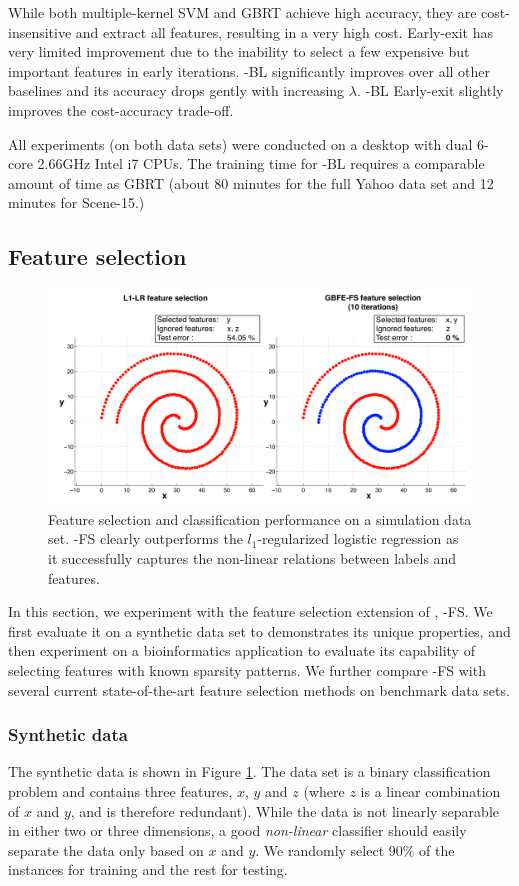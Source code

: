 While both multiple-kernel SVM and GBRT achieve high accuracy, they are cost-insensitive and extract all features, resulting in a very high cost. Early-exit has very limited improvement due to the inability to select a few expensive but important features in early iterations. \name{}-BL significantly improves over all other baselines and its accuracy drops gently with increasing $\lambda$. \name{}-BL Early-exit slightly improves the cost-accuracy trade-off.

All experiments (on both data sets) were conducted on a desktop with dual 6-core 2.66GHz Intel i7 CPUs. The training time for \name{}-BL requires a comparable amount of time as GBRT (about 80 minutes for the full Yahoo data set and 12 minutes for Scene-15.)


\subsection{Feature selection}

\begin{figure}[t!!!]
\centerline{
\includegraphics[width = .9\textwidth]{plots/simul}
}
\caption{Feature selection and classification performance on a simulation data set. \name{}-FS clearly outperforms the $l_1$-regularized logistic regression as it successfully captures the non-linear relations between labels and features.}
\label{fig:res_simul}
\end{figure}

In this section, we experiment with the feature selection extension of \name{}, \name{}-FS. We first evaluate it on a synthetic data set to demonstrates its unique properties, and then experiment on a bioinformatics application to evaluate its capability of selecting features with known sparsity patterns. We further compare \name{}-FS with several current state-of-the-art feature selection methods on benchmark data sets. 

\subsubsection{Synthetic data}
The synthetic data is shown in Figure \ref{fig:res_simul}. The data set is a binary classification problem and contains three features, $x$, $y$ and $z$ (where $z$ is a linear combination of $x$ and $y$, and is therefore redundant). While the data is not linearly separable in either two or three dimensions, a good \emph{non-linear} classifier should easily separate the data only based on $x$ and $y$. %
We randomly select $90\%$ of the instances for training and the rest for testing. 

